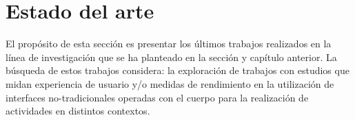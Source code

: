 \section{Estado del arte}
\label{sec:estado_arte}
El propósito de esta sección es presentar los últimos trabajos realizados en la línea de 
investigación que se ha planteado en la sección y capítulo anterior. La búsqueda de estos trabajos considera: la exploración de trabajos con estudios que midan experiencia de usuario y/o medidas de rendimiento en la utilización de interfaces no-tradicionales operadas con el cuerpo para la realización de actividades en distintos contextos. 
